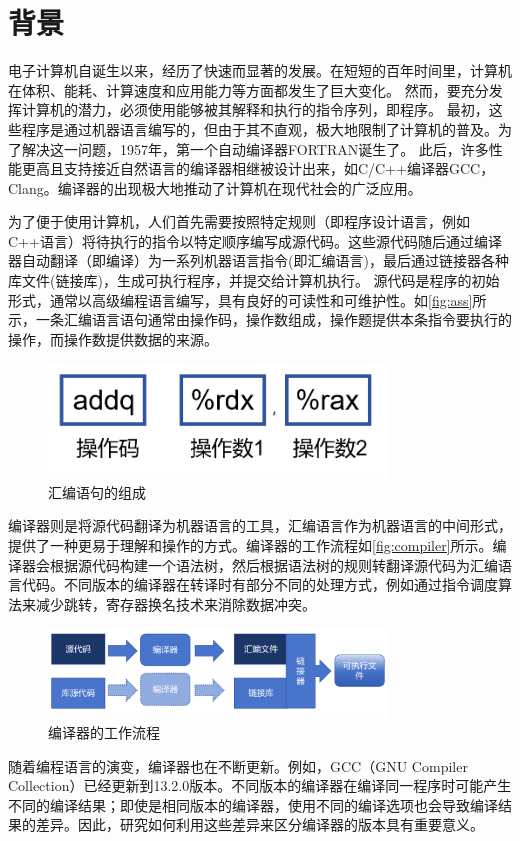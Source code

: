 \section{背景}
电子计算机自诞生以来，经历了快速而显著的发展。在短短的百年时间里，计算机在体积、能耗、计算速度和应用能力等方面都发生了巨大变化。
然而，要充分发挥计算机的潜力，必须使用能够被其解释和执行的指令序列，即程序。
最初，这些程序是通过机器语言编写的，但由于其不直观，极大地限制了计算机的普及。为了解决这一问题，1957年，第一个自动编译器FORTRAN诞生了。
此后，许多性能更高且支持接近自然语言的编译器相继被设计出来，如C/C++编译器GCC，Clang。编译器的出现极大地推动了计算机在现代社会的广泛应用。

\par
为了便于使用计算机，人们首先需要按照特定规则（即程序设计语言，例如C++语言）将待执行的指令以特定顺序编写成源代码。这些源代码随后通过编译器自动翻译（即编译）为一系列机器语言指令(即汇编语言)，最后通过链接器各种库文件(链接库)，生成可执行程序，并提交给计算机执行。
源代码是程序的初始形式，通常以高级编程语言编写，具有良好的可读性和可维护性。如\autoref{fig:ass}所示，一条汇编语言语句通常由操作码，操作数组成，操作题提供本条指令要执行的操作，而操作数提供数据的来源。
\begin{figure}[H]
    \centering
    \includegraphics[width=0.8\textwidth]{figures/ass.png}
    \caption{汇编语句的组成}
    \label{fig:ass}
\end{figure}
编译器则是将源代码翻译为机器语言的工具，汇编语言作为机器语言的中间形式，提供了一种更易于理解和操作的方式。编译器的工作流程如\autoref{fig:compiler}所示。编译器会根据源代码构建一个语法树，然后根据语法树的规则转翻译源代码为汇编语言代码。不同版本的编译器在转译时有部分不同的处理方式，例如通过指令调度算法来减少跳转，寄存器换名技术来消除数据冲突。
\begin{figure}[H]
    \centering
    \includegraphics[width=0.8\textwidth]{figures/compiler.png}
    \caption{编译器的工作流程}
    \label{fig:compiler}
\end{figure}
随着编程语言的演变，编译器也在不断更新。例如，GCC（GNU Compiler Collection）已经更新到13.2.0版本。不同版本的编译器在编译同一程序时可能产生不同的编译结果；即使是相同版本的编译器，使用不同的编译选项也会导致编译结果的差异。因此，研究如何利用这些差异来区分编译器的版本具有重要意义。
\par

